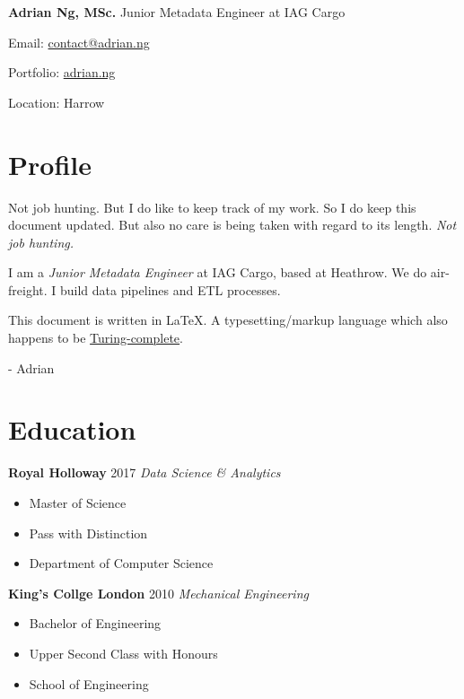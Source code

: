 \documentclass[letterpaper,11pt]{article}
\begin{document}
\noindent
\Large
\textbf{Adrian Ng, MSc.}
\newline
\small
Junior Metadata Engineer at IAG Cargo
\newline
\begin{description*}
	\item[Email:] \href{mailto:contact@adrian.ng}{contact@adrian.ng}
	\item[Portfolio:] \href{https://adrian.ng}{adrian.ng}
	\item[Location:] Harrow
\end{description*}
\hfill
\vspace{0.25cm}
\noindent
\begin{minipage}[t]{0.5\linewidth}
	\section{Profile}
	Not job hunting. But I do like to keep track of my work. So I do keep this document updated. But also no care is being taken with regard to its length. \textit{Not job hunting.}
	\par\quad

	I am a \textit{Junior Metadata Engineer} at IAG Cargo, based at Heathrow. We do air-freight. I build data pipelines and ETL processes.
	\par\quad

	This document is written in \LaTeX. A typesetting/markup language which also happens to be \href{https://www.overleaf.com/learn/latex/Articles/LaTeX_is_More_Powerful_than_you_Think_-_Computing_the_Fibonacci_Numbers_and_Turing_Completeness}{Turing-complete}.
	\par\quad

	- Adrian
\end{minipage}
\hspace{0.2cm}
\begin{minipage}[t]{0.3\linewidth}
	\section{Education}
	\textbf{Royal Holloway} \hfill 2017
	\newline
	\textit{Data Science \& Analytics}
	\begin{itemize}[leftmargin=*, itemsep=0.1em]
		\item	Master of Science
		\item	Pass with Distinction
		\item 	Department of Computer Science
	\end{itemize}
	\vspace{0.15cm}
	\textbf{King's Collge London} \hfill 2010
	\newline
	\textit{Mechanical Engineering}
	\begin{itemize}[leftmargin=*, itemsep=0.1em]
		\item Bachelor of Engineering
		\item Upper Second Class with Honours
		\item School of Engineering
	\end{itemize}
\end{minipage}
\end{document}
